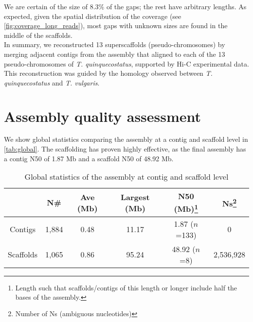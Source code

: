 We are certain of the size of 8.3\% of the gaps; the rest have arbitrary lengths. As expected, given the spatial distribution of the coverage (see \autoref{fig:coverage_long_reads}), most gaps with unknown sizes are found in the middle of the scaffolds.\\

In summary, we reconstructed 13 superscaffolds (pseudo-chromosomes) by merging adjacent contigs from the assembly that aligned to each of the 13 pseudo-chromosomes of \textit{T. quinquecostatus}, supported by \ac{Hi-C} experimental data. This reconstruction was guided by the homology observed between \textit{T. quinquecostatus} and \textit{T. vulgaris}.\\

\section*{Assembly quality assessment}

We show global statistics comparing the assembly at a contig and scaffold level in \autoref{tab:global}. The scaffolding has proven highly effective, as the final assembly has a contig N50 of 1.87 Mb and a scaffold N50 of 48.92 Mb. \\


\begin{table}[h!]
    \begin{minipage}{\linewidth}
    \renewcommand\thefootnote{\thempfootnote}
    \centering
    \begin{tabular}{@{}cccccc@{}}
        \toprule
        & N\#    & Ave (Mb) & Largest (Mb)& N50 (Mb)\footnote{Length such that scaffolds/contigs of this length or longer include half the bases of the assembly.}     & Ns\footnote{Number of Ns (ambiguous nucleotides)}      \\ \midrule
        Contigs      & 1,884 & 0.48     & 11.17        & 1.87 ($n$=133) & 0       \\
        Scaffolds & 1,065 & 0.86     & 95.24        & 48.92 ($n$=8)  & 2,536,928 \\ \bottomrule
        \end{tabular}
        \caption{Global statistics of the assembly at contig and scaffold level}
        \label{tab:global}
\end{minipage}
\end{table}

